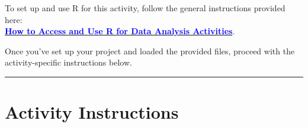 \documentclass[oneside,openany]{book}
\begin{document}
To set up and use R for this activity, follow the general instructions provided here:\\
\hyperref[how-to-set-up-r-for-data-analysis-activities]{\textcolor{blue}{\textbf{How to Access and Use R for Data Analysis Activities}}}.

Once you've set up your project and loaded the provided files, proceed with the activity-specific instructions below.

\begin{center}\rule{0.5\linewidth}{0.5pt}\end{center}

\section{Activity Instructions}\label{activity-instructions}
\end{document}
